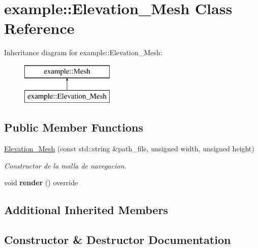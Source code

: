 \hypertarget{classexample_1_1_elevation___mesh}{}\section{example\+::Elevation\+\_\+\+Mesh Class Reference}
\label{classexample_1_1_elevation___mesh}
Inheritance diagram for example\+::Elevation\+\_\+\+Mesh\+:\begin{figure}[H]
\begin{center}
\leavevmode
\includegraphics[height=2.000000cm]{classexample_1_1_elevation___mesh}
\end{center}
\end{figure}
\subsection*{Public Member Functions}
\begin{DoxyCompactItemize}
\item 
\mbox{\hyperlink{classexample_1_1_elevation___mesh_a5d31baa6cf8f41c4f48c38d242c71315}{Elevation\+\_\+\+Mesh}} (const std\+::string \&path\+\_\+file, unsigned width, unsigned height)
\begin{DoxyCompactList}\small\item\em Constructor de la malla de navegacion. \end{DoxyCompactList}\item 
\mbox{\label{classexample_1_1_elevation___mesh_a37c5400af4021b619433bdcacd79f5e7}} 
void {\bfseries render} () override
\end{DoxyCompactItemize}
\subsection*{Additional Inherited Members}


\subsection{Constructor \& Destructor Documentation}
\mbox{\label{classexample_1_1_elevation___mesh_a5d31baa6cf8f41c4f48c38d242c71315}} 
